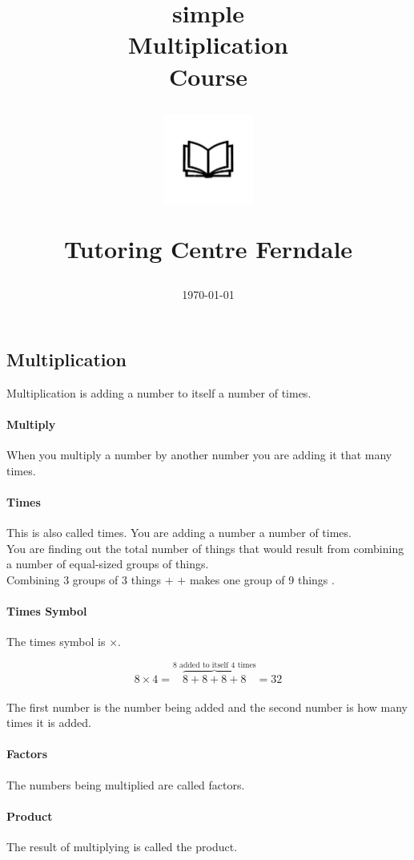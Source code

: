 \documentclass[12pt]{article}
\title{simple\\Multiplication\\Course\\
\begin{center}
\includegraphics[width=4em]{ApS_logo.png}
\end{center}
\begin{normalsize}Tutoring Centre Ferndale\end{normalsize}}
\author{}
\date{\today}
\begin{document}
\maketitle

\subsection*{Multiplication}

Multiplication is adding a number to itself a number of times.

\paragraph{Multiply}
When you multiply a number by another number you are adding it that many times.

\paragraph{Times}
This is also called times. You are adding a number a number of times.\\

You are finding out the total number of things that would result from combining a number of equal-sized groups of things.\\

Combining 3 groups of 3 things  $+$  $+$  makes one group of 9 things .\\

\paragraph{Times Symbol}
The times symbol is $\times$.

$$8 \times 4 = \overbrace{8+8+8+8}^{\textrm{8 added to itself 4 times}} = 32$$\\

The first number is the number being added and the second number is how many times it is added.

\paragraph{Factors}
The numbers being multiplied are called factors.

\paragraph{Product}
The result of multiplying is called the product.
\end{document}
